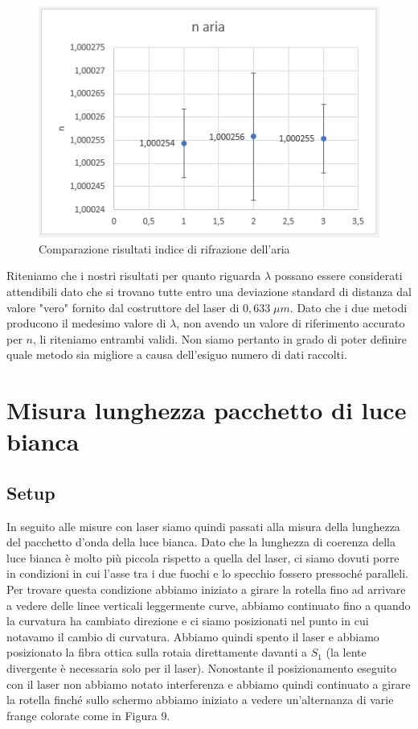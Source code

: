 \documentclass{article}
\begin{document}
\begin{figure}[h!]
  \centering
  \includegraphics[width=0.6\linewidth]{IM grafico risultati n}
  \caption{Comparazione risultati indice di rifrazione dell'aria}
\end{figure}


Riteniamo che i nostri risultati per quanto riguarda $\lambda$ possano essere considerati attendibili dato che si trovano tutte entro una deviazione standard di distanza dal valore "vero" fornito dal costruttore del laser di $0,633 \; \mu m$. Dato che i due metodi producono il medesimo valore di $\lambda$, non avendo un valore di riferimento accurato per $n$, li riteniamo entrambi validi. Non siamo pertanto in grado di poter definire quale metodo sia migliore a causa dell'esiguo numero di dati raccolti. 




\section{Misura lunghezza pacchetto di luce bianca}

\subsection{Setup}
In seguito alle misure con laser siamo quindi passati alla misura della lunghezza del pacchetto d'onda della luce bianca. Dato che la lunghezza di coerenza della luce bianca è molto più piccola rispetto a quella del laser, ci siamo dovuti porre in condizioni in cui l'asse tra i due fuochi e lo specchio fossero pressoché paralleli. Per trovare questa condizione abbiamo iniziato a girare la rotella fino ad arrivare a vedere delle linee verticali leggermente curve, abbiamo continuato fino a quando la curvatura ha cambiato direzione e ci siamo posizionati nel punto in cui notavamo il cambio di curvatura. Abbiamo quindi spento il laser e abbiamo posizionato la fibra ottica sulla rotaia direttamente davanti a $S_1$ (la lente divergente è necessaria solo per il laser). Nonostante il posizionamento eseguito con il laser non abbiamo notato interferenza e abbiamo quindi continuato a girare la rotella finché sullo schermo abbiamo iniziato a vedere un'alternanza di varie frange colorate come in Figura 9.
\end{document}
